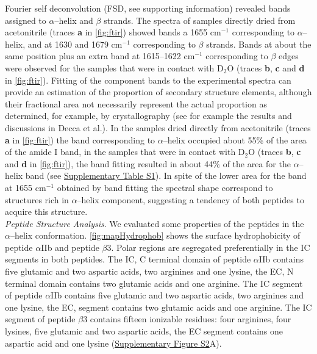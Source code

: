 \documentclass[journal=jacsat,manuscript=article]{achemso}
\begin{document}
Fourier self deconvolution (FSD, see supporting information) revealed bands assigned to $\alpha$–helix and $\beta$ strands.\cite{1986_Byler} The spectra of samples directly dried from acetonitrile (traces \textbf{a} in \autoref{fig:ftir}) showed bands a 1655 cm$^{-1}$ corresponding to $\alpha$–helix, and at 1630 and 1679 cm$^{-1}$ corresponding to  $\beta$ strands. Bands at about the same position plus an extra band at 1615–1622 cm$^{-1}$ corresponding to  $\beta$ edges\cite{2003_Nolan} were observed for the samples that were in contact with D$_2$O (traces \textbf{b}, \textbf{c} and \textbf{d} in \autoref{fig:ftir}). Fitting of the component bands to the experimental spectra can provide an estimation of the proportion of secondary structure elements, although their fractional area not necessarily represent the actual proportion as determined, for example, by crystallography (see for example the results and discussions in Decca et al.\cite{2019_Decca}). In the samples dried directly from acetonitrile (traces \textbf{a} in \autoref{fig:ftir}) the band corresponding to $\alpha$–helix occupied about 55\% of the area of the amide I band, in the samples that were in contact with D$_2$O (traces \textbf{b}, \textbf{c} and \textbf{d} in \autoref{fig:ftir}), the band fitting resulted in about 44\% of the area for the $\alpha$–helix band (see \hyperref[sec:support]{Supplementary Table S1}). In spite of the lower area for the band at 1655 cm$^{-1}$ obtained by band fitting the spectral shape correspond to structures rich in $\alpha$–helix component, suggesting a tendency of both peptides to acquire this structure.\\


\noindent \textit{Peptide Structure Analysis}. 
We evaluated some properties of the peptides in the $\alpha$–helix conformation. \autoref{fig:mapHydrophob} shows the surface hydrophobicity of peptide $\alpha$IIb and peptide $\beta$3. Polar regions are segregated preferentially in the IC segments in both peptides. The IC, C terminal domain of peptide $\alpha$IIb contains five glutamic and two aspartic acids, two arginines and one lysine, the EC, N terminal domain contains two glutamic acids and one arginine. 
The IC segment of peptide $\alpha$IIb contains five glutamic and two aspartic acids, two arginines and one lysine, the EC, segment contains two glutamic acids and one arginine. The IC segment of peptide $\beta$3 contains fifteen ionizable residues: four arginines, four lysines, five glutamic and two aspartic acids, the EC segment contains one aspartic acid and one lysine (\hyperref[sec:support]{Supplementary Figure S2}A).
\end{document}
